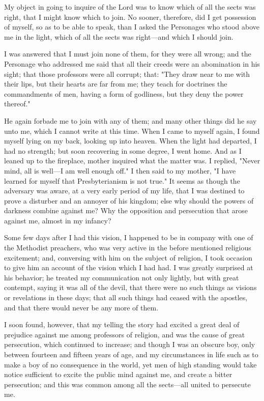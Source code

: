 My object in going to inquire of the Lord was to know which of all the sects was right, that I
might know which to join. No sooner, therefore, did I get possession of myself, so as to be
able to speak, than I asked the Personages who stood above me in the light, which of all the
sects was right—and which I should join.

I was answered that I must join none of them, for they were all wrong; and the Personage
who addressed me said that all their creeds were an abomination in his sight; that those
professors were all corrupt; that: "They draw near to me with their lips, but their hearts are
far from me; they teach for doctrines the commandments of men, having a form of godliness,
but they deny the power thereof."

He again forbade me to join with any of them; and many other things did he say unto me,
which I cannot write at this time. When I came to myself again, I found myself lying on my
back, looking up into heaven. When the light had departed, I had no strength; but soon
recovering in some degree, I went home. And as I leaned up to the fireplace, mother inquired
what the matter was. I replied, "Never mind, all is well—I am well enough off." I then said to
my mother, "I have learned for myself that Presbyterianism is not true." It seems as though
the adversary was aware, at a very early period of my life, that I was destined to prove a
disturber and an annoyer of his kingdom; else why should the powers of darkness combine
against me? Why the opposition and persecution that arose against me, almost in my
infancy?

Some few days after I had this vision, I happened to be in company with one of the
Methodist preachers, who was very active in the before mentioned religious excitement; and,
conversing with him on the subject of religion, I took occasion to give him an account of the
vision which I had had. I was greatly surprised at his behavior; he treated my communication
not only lightly, but with great contempt, saying it was all of the devil, that there were no
such things as visions or revelations in these days; that all such things had ceased with the
apostles, and that there would never be any more of them.

I soon found, however, that my telling the story had excited a great deal of prejudice against
me among professors of religion, and was the cause of great persecution, which continued to
increase; and though I was an obscure boy, only between fourteen and fifteen years of age,
and my circumstances in life such as to make a boy of no consequence in the world, yet men
of high standing would take notice sufficient to excite the public mind against me, and create
a bitter persecution; and this was common among all the sects—all united to persecute me.

